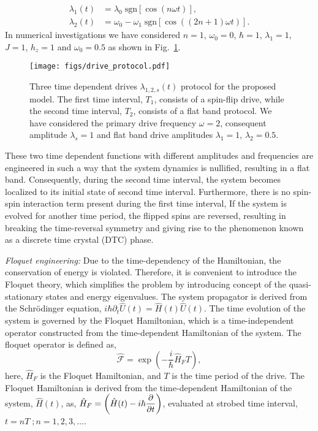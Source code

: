 \documentclass[%
reprint,
superscriptaddress,
amsmath,amssymb,
aps,
prb,
showkeys,
]{revtex4-2}
\begin{document}
\begin{align}
    \lambda_1(t) &= \lambda_0 \;\mathrm{sgn}[\cos(n\omega t)],\\
    \lambda_2(t) &= \omega_0 - \omega_1 \;\mathrm{sgn}[\cos((2n+1)\omega t)].
\end{align}
 In numerical investigations we have considered $n=1$, $\omega_0 = 0$, $\hbar =1$, $\lambda_1 = 1$, $J=1$, $h_z=1$ and $\omega_0 = 0.5$ as shown in Fig.~\ref{fig:flatband_drive_protocol}.
\begin{figure}[t]
    \centering
    \texttt{[image: figs/drive\_protocol.pdf]}
    \caption{Three time dependent drives $\lambda_{1,2,s}(t)$ protocol for the proposed model. The first time interval, $T_1$, consists of a spin-flip drive, while the second time interval, $T_2$, consists of a flat band protocol. We have considered the primary drive frequency $\omega = 2$, consequent amplitude $\lambda_s = 1$ and flat band drive amplitudes $\lambda_1 = 1$, $\lambda_2 = 0.5$.}
    \label{fig:flatband_drive_protocol}
\end{figure}
These two time dependent functions with different amplitudes and frequencies are engineered in such a way that the system dynamics is nullified, resulting in a flat band. Consequently, during the second time interval, the system becomes localized to its initial state of second time interval. Furthermore, there is no spin-spin interaction term present during the first time interval,  If the system is evolved for another time period, the flipped spins are reversed, resulting in breaking the time-reversal symmetry and giving rise to the phenomenon known as a discrete time crystal (DTC) phase.

\textit{Floquet engineering:} Due to the time-dependency of the Hamiltonian, the conservation of energy is violated. Therefore, it is convenient to introduce the Floquet theory, which simplifies the problem by introducing concept of the  quasi-stationary states and energy eigenvalues. The system propagator is derived from the Schr\"odinger equation, $\displaystyle i \hbar \partial_t \hat{U}(t) = \hat{H}(t) \hat{U}(t)$. The time evolution of the system is governed by the Floquet Hamiltonian, which is a time-independent operator constructed from the time-dependent Hamiltonian of the system.
The floquet operator is defined as,
\begin{equation}
    \hat{\mathcal{F}} = \exp(-\frac{i}{\hbar}\hat{H}_F T),
\end{equation}
here, $\hat{H}_F$ is the Floquet Hamiltonian, and $T$ is the time period of the drive. The Floquet Hamiltonian is derived from the time-dependent Hamiltonian of the system, $\hat{H}(t)$, as, $\displaystyle  \hat{H}_F = \left(\hat{H}(t) -i\hbar \partialderivative{t}\right)$, evaluated at strobed time interval, $t=nT\; ;n=1,2,3,\dots$.
\end{document}

